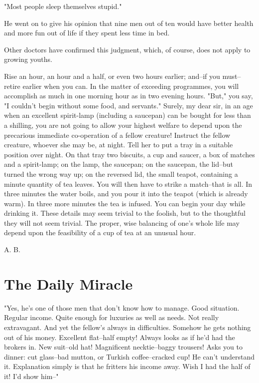 "Most people sleep themselves stupid."

He went on to give his opinion that nine men out of ten would have
better health and more fun out of life if they spent less time in bed.

Other doctors have confirmed this judgment, which, of course, does not
apply to growing youths.

Rise an hour, an hour and a half, or even two hours earlier; and--if
you must--retire earlier when you can.  In the matter of exceeding
programmes, you will accomplish as much in one morning hour as in two
evening hours.  "But," you say, "I couldn't begin without some food,
and servants."  Surely, my dear sir, in an age when an excellent
spirit-lamp (including a saucepan) can be bought for less than a
shilling, you are not going to allow your highest welfare to depend
upon the precarious immediate co-operation of a fellow creature!
Instruct the fellow creature, whoever she may be, at night.  Tell her
to put a tray in a suitable position over night. On that tray two
biscuits, a cup and saucer, a box of matches and a spirit-lamp; on the
lamp, the saucepan; on the saucepan, the lid--but turned the wrong way
up; on the reversed lid, the small teapot, containing a minute quantity
of tea leaves.  You will then have to strike a match--that is all.  In
three minutes the water boils, and you pour it into the teapot (which
is already warm).  In three more minutes the tea is infused.  You can
begin your day while drinking it.  These details may seem trivial to
the foolish, but to the thoughtful they will not seem trivial.  The
proper, wise balancing of one's whole life may depend upon the
feasibility of a cup of tea at an unusual hour.\\
\vspace*{1em}

A. B.

\addtocounter{chapter}{1}\chapter*{The Daily Miracle}

"Yes, he's one of those men that don't know how to manage. Good
situation.  Regular income.  Quite enough for luxuries as well as
needs.  Not really extravagant.  And yet the fellow's always in
difficulties.  Somehow he gets nothing out of his money.  Excellent
flat--half empty!  Always looks as if he'd had the brokers in.  New
suit--old hat!  Magnificent necktie--baggy trousers!  Asks you to
dinner:  cut glass--bad mutton, or Turkish coffee--cracked cup!  He
can't understand it.  Explanation simply is that he fritters his income
away.  Wish I had the half of it! I'd  show him--"

